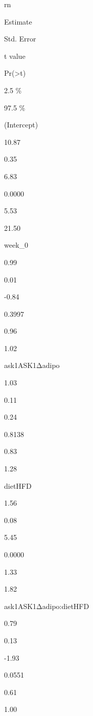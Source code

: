 \documentclass[]{book}
\newenvironment{Shaded}{\begin{snugshade}}{\end{snugshade}}
\newcommand{\DataTypeTok}[1]{\textcolor[rgb]{0.13,0.29,0.53}{#1}}
\newcommand{\KeywordTok}[1]{\textcolor[rgb]{0.13,0.29,0.53}{\textbf{#1}}}
\newcommand{\NormalTok}[1]{#1}
\newcommand{\OperatorTok}[1]{\textcolor[rgb]{0.81,0.36,0.00}{\textbf{#1}}}
\newcommand{\OtherTok}[1]{\textcolor[rgb]{0.56,0.35,0.01}{#1}}
\newcommand{\StringTok}[1]{\textcolor[rgb]{0.31,0.60,0.02}{#1}}
\begin{document}
rn

Estimate

Std. Error

t value

Pr(\textgreater\textbar t\textbar)

2.5 \%

97.5 \%

(Intercept)

10.87

0.35

6.83

0.0000

5.53

21.50

week\_0

0.99

0.01

-0.84

0.3997

0.96

1.02

ask1ASK1Δadipo

1.03

0.11

0.24

0.8138

0.83

1.28

dietHFD

1.56

0.08

5.45

0.0000

1.33

1.82

ask1ASK1Δadipo:dietHFD

0.79

0.13

-1.93

0.0551

0.61

1.00

\begin{Shaded}
\end{Shaded}
\end{document}
